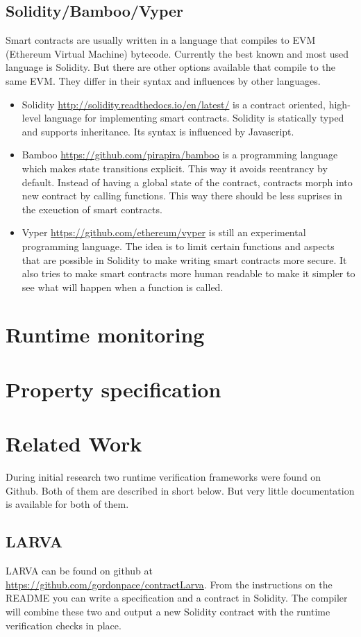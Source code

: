 \documentclass[a4paper]{article}
\begin{document}
\subsection{Solidity/Bamboo/Vyper}
Smart contracts are usually written in a language that compiles to EVM (Ethereum Virtual Machine) bytecode. Currently the best known and most used language is Solidity. But there are other options available that compile to the same EVM. They differ in their syntax and influences by other languages.  
\begin{itemize}
\item Solidity \url{http://solidity.readthedocs.io/en/latest/} is a contract oriented, high-level language for implementing smart contracts. Solidity is statically typed and supports inheritance. Its syntax is influenced by Javascript.
\item Bamboo \url{https://github.com/pirapira/bamboo} is a programming language which makes state transitions explicit. This way it avoids reentrancy by default. Instead of having a global state of the contract, contracts morph into new contract by calling functions. This way there should be less suprises in the exeuction of smart contracts.
\item Vyper \url{https://github.com/ethereum/vyper} is still an experimental programming language. The idea is to limit certain functions and aspects that are possible in Solidity to make writing smart contracts more secure. It also tries to make smart contracts more human readable to make it simpler to see what will happen when a function is called. 
\end{itemize}


\section{Runtime monitoring} 


\section{Property specification}


\section{Related Work}
During initial research two runtime verification frameworks were found on Github. Both of them are described in short below. But very little documentation is available for both of them.
\subsection{LARVA}
LARVA can be found on github at \url{https://github.com/gordonpace/contractLarva}. From the instructions on the README you can write a specification and a contract in Solidity. The compiler will combine these two and output a new Solidity contract with the runtime verification checks in place. 
\end{document}
